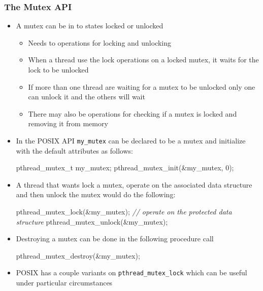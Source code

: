 \documentclass[11pt]{article}
\providecommand{\tightlist}{%
      \setlength{\itemsep}{0pt}\setlength{\parskip}{0pt}}
\newenvironment{Shaded}{}{}
\newcommand{\DecValTok}[1]{\textcolor[rgb]{0.25,0.63,0.44}{{#1}}}
\newcommand{\CommentTok}[1]{\textcolor[rgb]{0.38,0.63,0.69}{\textit{{#1}}}}
\newcommand{\NormalTok}[1]{{#1}}
\begin{document}
    \subsubsection{The Mutex API}\label{the-mutex-api}

\begin{itemize}
\item
  A mutex can be in to states locked or unlocked

  \begin{itemize}
  \tightlist
  \item
    Needs to operations for locking and unlocking
  \item
    When a thread use the lock operations on a locked mutex, it waits
    for the lock to be unlocked
  \item
    If more than one thread are waiting for a mutex to be unlocked only
    one can unlock it and the others will wait
  \item
    There may also be operations for checking if a mutex is locked and
    removing it from memory
  \end{itemize}
\item
  In the POSIX API \texttt{my\_mutex} can be declared to be a mutex and
  initialize with the default attributes as follows:

\begin{Shaded}
\begin{Highlighting}[]
\NormalTok{pthread_mutex_t my_mutex;}
\NormalTok{pthread_mutex_init(&my_mutex, }\DecValTok{0}\NormalTok{);}
\end{Highlighting}
\end{Shaded}
\item
  A thread that wants lock a mutex, operate on the associated data
  structure and then unlock the mutex would do the following:

\begin{Shaded}
\begin{Highlighting}[]
\NormalTok{pthread_mutex_lock(&my_mutex);}
\CommentTok{// operate on the protected data structure}
\NormalTok{pthread_mutex_unlock(&my_mutex);}
\end{Highlighting}
\end{Shaded}
\item
  Destroying a mutex can be done in the following procedure call

\begin{Shaded}
\begin{Highlighting}[]
\NormalTok{pthread_mutex_destroy(&my_mutex);}
\end{Highlighting}
\end{Shaded}
\item
  POSIX has a couple variants on \texttt{pthread\_mutex\_lock} which can
  be useful under particular circumstances


\end{itemize}
\end{document}
